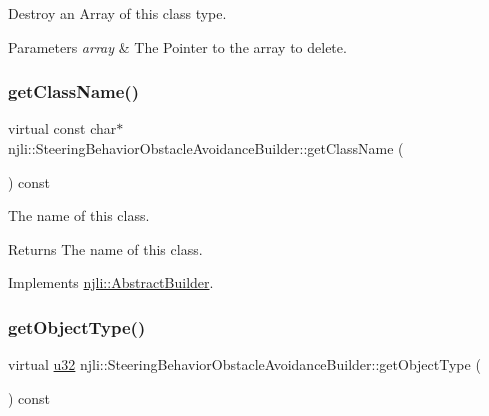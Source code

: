 Destroy an Array of this class type.


\begin{DoxyParams}{Parameters}
{\em array} & The Pointer to the array to delete. \\
\hline
\end{DoxyParams}
\mbox{\label{classnjli_1_1_steering_behavior_obstacle_avoidance_builder_a993b8b48be00564264eee0e58bd0bbd6}} 
\subsubsection{\texorpdfstring{get\+Class\+Name()}{getClassName()}}
{\footnotesize\ttfamily virtual const char$\ast$ njli\+::\+Steering\+Behavior\+Obstacle\+Avoidance\+Builder\+::get\+Class\+Name (\begin{DoxyParamCaption}{ }\end{DoxyParamCaption}) const\hspace{0.3cm}{\ttfamily [virtual]}}

The name of this class.

\begin{DoxyReturn}{Returns}
The name of this class. 
\end{DoxyReturn}


Implements \mbox{\hyperlink{classnjli_1_1_abstract_builder_a902f73ea78031b06aca183a417f3413b}{njli\+::\+Abstract\+Builder}}.

\mbox{\label{classnjli_1_1_steering_behavior_obstacle_avoidance_builder_a8dc9e8fb3607fadbcda02aec50d0a94d}} 
\subsubsection{\texorpdfstring{get\+Object\+Type()}{getObjectType()}}
{\footnotesize\ttfamily virtual \mbox{\hyperlink{_util_8h_a10e94b422ef0c20dcdec20d31a1f5049}{u32}} njli\+::\+Steering\+Behavior\+Obstacle\+Avoidance\+Builder\+::get\+Object\+Type (\begin{DoxyParamCaption}{ }\end{DoxyParamCaption}) const\hspace{0.3cm}{\ttfamily [virtual]}}

